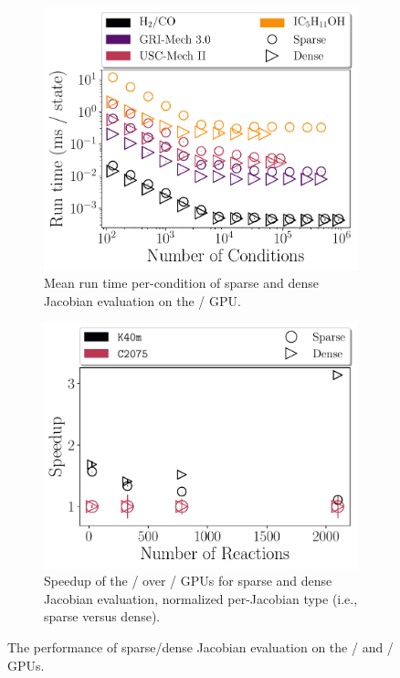 \documentclass[12pt,number,sort&compress,preprint]{elsarticle}
\begin{document}
\begin{figure}[htbp]
   \centering
  \begin{subfigure}[t]{0.48\linewidth}
      \includegraphics[width=\textwidth]{gpu_sparse_vs_dense.pdf}
      \caption{Mean run time per-condition of sparse and dense Jacobian evaluation on the \gpunew/ GPU.}
      \label{F:gpu_sparse_vs_dense}
  \end{subfigure}
  \hfill
  \begin{subfigure}[t]{0.48\linewidth}
      \includegraphics[width=\textwidth]{gpu_jacobian_speedup.pdf}
      \caption{Speedup of the \gpunew/ over \gpuold/ GPUs for sparse and dense Jacobian evaluation, normalized per-Jacobian type (i.e., sparse versus dense).}
      \label{F:gpu_jacobian_speedup}
  \end{subfigure}
  \caption{The performance of sparse\slash dense Jacobian evaluation on the \gpunew/ and \gpuold/ GPUs.}
\end{figure}
\end{document}

